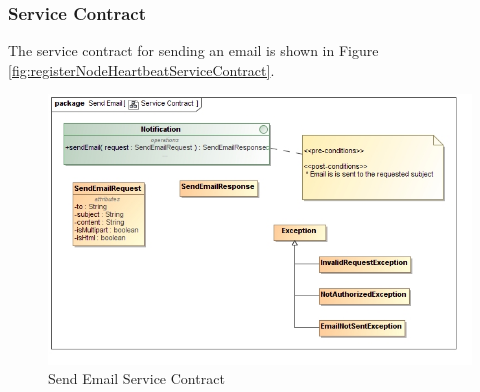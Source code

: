 \subsubsection{Service Contract}
The service contract for sending an email is shown in 
Figure \ref{fig:registerNodeHeartbeatServiceContract}.
\begin{figure}[H]
	\begin{center}
		\includegraphics[scale=0.38]{../Diagrams and Charts/Notifications/Send Email Service Contract.jpg}
		\caption{Send Email Service Contract}
		\label{fig:sendEmailServiceContract}
	\end{center}	
\end{figure}

